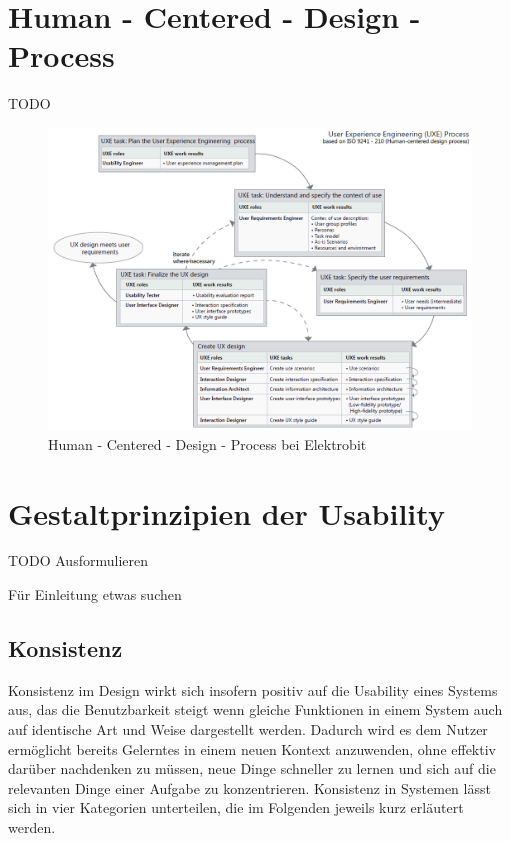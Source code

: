 \newpage
\section{Human - Centered - Design - Process}
TODO

\begin{figure} [!h]
\begin{center}
  \includegraphics[width=\textwidth]{figures/HCD.png}
  \caption{Human - Centered - Design - Process bei Elektrobit}
  \label{fig:HCD}
\end{center}
\end{figure}

\section{Gestaltprinzipien der Usability}
TODO Ausformulieren

\cite{Norman.2016} Für Einleitung etwas suchen

\subsection*{Konsistenz}
Konsistenz im Design wirkt sich insofern positiv auf die Usability eines Systems aus, das die Benutzbarkeit steigt wenn gleiche Funktionen in einem System auch auf identische Art und Weise dargestellt werden.
Dadurch wird es dem Nutzer ermöglicht bereits Gelerntes in einem neuen Kontext anzuwenden, ohne effektiv darüber nachdenken zu müssen, neue Dinge schneller zu lernen und sich auf die relevanten Dinge einer Aufgabe zu konzentrieren.
Konsistenz in Systemen lässt sich in vier Kategorien unterteilen, die im Folgenden jeweils kurz erläutert werden.

